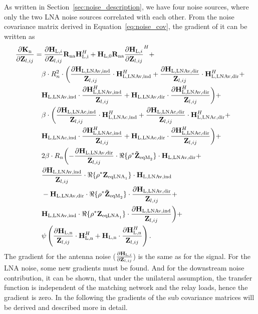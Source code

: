 As written in Section~\ref{sec:noise_description}, we have four noise sources, where only the two LNA noise sources correlated with each other.
From the noise covariance matrix derived in Equation~\eqref{eq:noise_cov}, the gradient of it can be written as
\begin{align}
\label{eq:noise_grad}\nonumber
\frac{\partial\mathbf{K}_\text{n}}{\partial\mathbf{Z}_{l,ij}} &= 
\frac{\partial\mathbf{H}_{\text{L,}i}}{\partial\mathbf{Z}_{l,ij}}
	\mathbf{R}_\text{na}\mathbf{H}_\text{\text{L,}i}^H +
	\mathbf{H}_\text{L,0}\mathbf{R}_\text{na}
	\frac{\partial \mathbf{H}_{\text{L,}i}}{\partial\mathbf{Z}_{l,ij}}^H+\\\nonumber
&\quad	\beta \cdot R_n^2\cdot\biggl(
	\frac{\partial \mathbf{H}_\text{L,LNAv,ind}}{\mathbf{Z}_{l,ij}}\cdot
	\mathbf{H}_\text{L,LNAv,ind}^H+
	\frac{\partial \mathbf{H}_\text{L,LNAv,dir}}{\mathbf{Z}_{l,ij}}\cdot
	\mathbf{H}_\text{L,LNAv,dir}^H + \\\nonumber
&\quad	\mathbf{H}_\text{L,LNAv,ind}\cdot
	\frac{\partial\mathbf{H}_\text{L,LNAv,ind}^H}{\mathbf{Z}_{l,ij}} +
	\mathbf{H}_\text{L,LNAv,dir}\cdot
	\frac{\partial\mathbf{H}_\text{L,LNAv,dir}^H}{\mathbf{Z}_{l,ij}}
	\biggr)+\\\nonumber
&\quad	\beta \cdot \biggl(
	\frac{\partial\mathbf{H}_\text{L,LNAc,ind}}{\mathbf{Z}_{l,ij}}\cdot
	\mathbf{H}_\text{L,LNAc,ind}^H+
	\frac{\partial\mathbf{H}_\text{L,LNAc,dir}}{\mathbf{Z}_{l,ij}}\cdot
	\mathbf{H}_\text{L,LNAc,dir}^H+\\\nonumber
&\quad	\mathbf{H}_\text{L,LNAc,ind}\cdot
	\frac{\partial\mathbf{H}_\text{L,LNAc,ind}^H}{\mathbf{Z}_{l,ij}}+
	\mathbf{H}_\text{L,LNAc,dir}\cdot
	\frac{\partial\mathbf{H}_\text{L,LNAc,dir}^H}{\mathbf{Z}_{l,ij}}
	\biggr)+\\\nonumber
&\quad	2\beta \cdot R_n\biggl(
	-\frac{\partial\mathbf{H}_\text{L,LNAv,dir}}{\mathbf{Z}_{l,ij}} \cdot
	\Re\{\rho^*\mathbf{\tilde{Z}}_{\text{eqM}_2}\}\cdot
	\mathbf{H}_\text{L,LNAv,dir}+\\\nonumber
&\quad	\frac{\partial\mathbf{H}_\text{L,LNAv,ind}}{\mathbf{Z}_{l,ij}} \cdot
	\Re\{\rho^*\mathbf{Z}_{\text{eqLNA}_1}\}\cdot
	\mathbf{H}_\text{L,LNAv,ind}\\\nonumber
&\quad	-\mathbf{H}_\text{L,LNAv,dir} \cdot
	\Re\{\rho^*\mathbf{\tilde{Z}}_{\text{eqM}_2}\}\cdot
	\frac{\partial\mathbf{H}_\text{L,LNAv,dir}}{\mathbf{Z}_{l,ij}}+\\\nonumber
&\quad	\mathbf{H}_\text{L,LNAv,ind} \cdot
	\Re\{\rho^*\mathbf{Z}_{\text{eqLNA}_1}\}\cdot
	\frac{\partial\mathbf{H}_\text{L,LNAv,ind}}{\mathbf{Z}_{l,ij}}
	\biggr)+\\
&\quad	\psi\left(
	\frac{\partial\mathbf{H}_\text{L,n}}{\mathbf{Z}_{l,ij}} \cdot \mathbf{H}_\text{L,n}^H+
	\mathbf{H}_\text{L,n}\cdot\frac{\partial\mathbf{H}_\text{L,n}^H}{\mathbf{Z}_{l,ij}}
	\right).
\end{align}
The gradient for the antenna noise ($\frac{\partial\mathbf{H}_{\text{L,}i}}{\partial\mathbf{Z}_{l,ij}}$) is the same as for the signal.
For the LNA noise, some new gradients must be found.
And for the downstream noise contribution, it can be shown, that under the unilateral assumption, the transfer function is independent of the matching network and the relay loads, hence the gradient is zero.
In the following the gradients of the sub covariance matrices will be derived and described more in detail.


